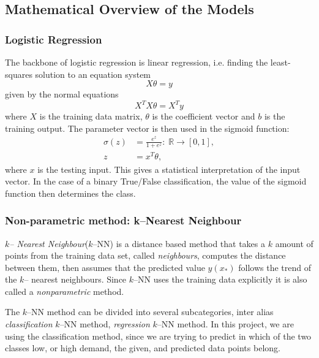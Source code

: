 \subsection{Mathematical Overview of the Models}
    \subsubsection{Logistic Regression}
    The backbone of logistic regression is linear regression, i.e. finding the least-squares solution to an equation system \begin{equation}
        X\theta = y
    \end{equation}
    given by the normal equations \begin{equation}
        X^TX \theta = X^Ty
    \end{equation}
    where $X$ is the training data matrix, $\theta$ is the coefficient vector and $b$ is the training output. The parameter vector is then used in the sigmoid function: \begin{align}
        \sigma(z) &= \frac{e^{z}}{1+e^{z}}: \; \mathbb{R}\to [0,1],\\
        z &= x^T \theta,
    \end{align}
    where $x$ is the testing input. This gives a statistical interpretation of the input vector. In the case of a binary True/False classification, the value of the sigmoid function then determines the class.

    \subsubsection{Non-parametric method: k--Nearest Neighbour}
        \emph{$k$-- Nearest Neighbour}($k$--NN) is a distance based method that takes a $k$ amount of points from the training data set, called \emph{neighbours}, computes the distance between them, then assumes that the predicted value $\hat{y}(x_{*})$ follows the trend of the $k$-- nearest neighbours. Since $k$--NN uses the training data explicitly it is also called a \emph{nonparametric} method.

    The $k$--NN method can be divided into several subcategories, inter alias \emph{classification} $k$--NN method, \emph{regression}  $k$--NN method. In this project, we are using the classification method, since we are trying to predict in which of the two classes low, or high demand, the given, and predicted data points belong.

